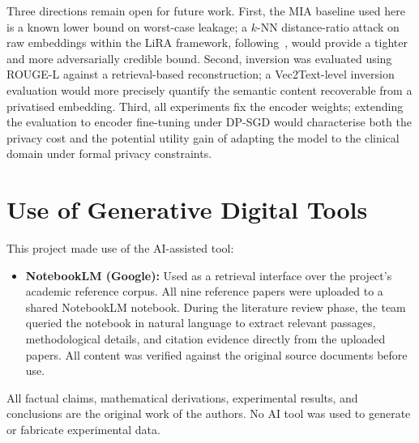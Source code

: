 \documentclass[11pt, a4paper]{article}
\begin{document}
Three directions remain open for future work. First, the MIA baseline used here is a known lower bound on worst-case leakage; a $k$-NN distance-ratio attack on raw embeddings within the LiRA framework, following~\citet{carlini2022membership}, would provide a tighter and more adversarially credible bound. Second, inversion was evaluated using ROUGE-L against a retrieval-based reconstruction; a Vec2Text-level inversion evaluation would more precisely quantify the semantic content recoverable from a privatised embedding. Third, all experiments fix the encoder weights; extending the evaluation to encoder fine-tuning under DP-SGD would characterise both the privacy cost and the potential utility gain of adapting the model to the clinical domain under formal privacy constraints.

\section{Use of Generative Digital Tools}

This project made use of the AI-assisted tool:

\begin{itemize}
  \item \textbf{NotebookLM (Google):} Used as a retrieval interface over the
    project's academic reference corpus. All nine reference papers were uploaded
    to a shared NotebookLM notebook. During the literature review phase, the team
    queried the notebook in natural language to extract relevant passages,
    methodological details, and citation evidence directly from the uploaded papers.
    All content was verified against the original source documents before use.
\end{itemize}

All factual claims, mathematical derivations, experimental results, and conclusions
are the original work of the authors. No AI tool was used to generate or fabricate
experimental data.




\hspace{-2cm}
\end{document}
